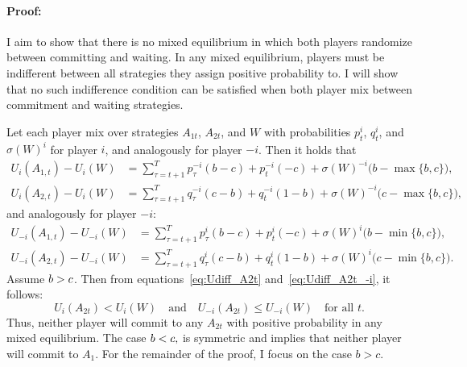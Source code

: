 \documentclass[../paper.tex]{subfiles}
\begin{document}
\paragraph{Proof:}
I aim to show that there is no mixed equilibrium in which both players randomize between committing and waiting. 
In any mixed equilibrium, players must be indifferent between all strategies they assign positive probability to.
I will show that no such indifference condition can be satisfied when both player mix between commitment and waiting strategies.

Let each player mix over strategies $A_{1t}$, $A_{2t}$, and $W$ with probabilities $p_t^i$, $q_t^i$, and $\sigma(W)^i$ for player $i$, and analogously for player $-i$. Then it holds that
\begin{align}
    U_i(A_{1, t}) - U_i(W) 
    &= \sum_{\tau = t+1}^T p_{\tau}^{-i}(b-c) + p_{t}^{-i}(-c) + \sigma(W)^{-i} \bigl(b - \max\{b,c\}\bigr),
    \label{eq:Udiff_A1t} \\[6pt]
    U_i(A_{2, t}) - U_i(W) 
    &= \sum_{\tau = t+1}^T q_{\tau}^{-i}(c-b) + q_{t}^{-i}(1-b) + \sigma(W)^{-i} \bigl(c - \max\{b,c\}\bigr),
    \label{eq:Udiff_A2t}
\end{align}
and analogously for player $-i$:
\begin{align}
    U_{-i}(A_{1, t}) - U_{-i}(W) 
    &= \sum_{\tau = t+1}^T p_{\tau}^{i}(b-c) + p_{t}^{i}(-c) + \sigma(W)^{i} \bigl(b - \min\{b,c\}\bigr),
    \label{eq:Udiff_A1t_-i} \\[6pt]
    U_{-i}(A_{2, t}) - U_{-i}(W) 
    &= \sum_{\tau = t+1}^T q_{\tau}^{i}(c-b) + q_{t}^{i}(1-b) + \sigma(W)^{i} \bigl(c - \min\{b,c\}\bigr).
    \label{eq:Udiff_A2t_-i}
\end{align}
Assume $b > c$. Then from equations~\eqref{eq:Udiff_A2t} and~\eqref{eq:Udiff_A2t_-i}, it follows:
\[
U_i(A_{2t}) < U_i(W) \quad \text{and} \quad U_{-i}(A_{2t}) \leq U_{-i}(W) \quad \text{for all } t.
\]
Thus, neither player will commit to any $A_{2t}$ with positive probability in any mixed equilibrium. The case $b < c,$ is symmetric and implies that neither player will commit to $A_1$. For the remainder of the proof, I focus on the case $b > c$.
\end{document}
